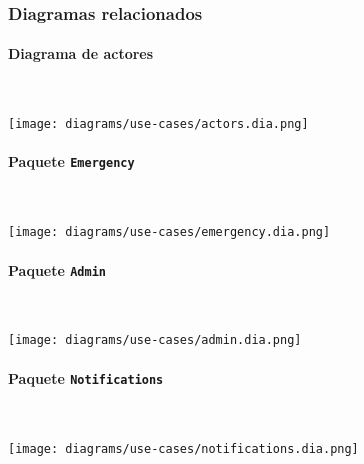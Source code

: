 \subsubsection{Diagramas relacionados}
\paragraph{Diagrama de actores} \hfill \\
\begin{minipage}{\linewidth}
    \texttt{[image: diagrams/use-cases/actors.dia.png]}
\end{minipage}

\clearpage
\paragraph{Paquete \texttt{Emergency}} \hfill \\
\begin{minipage}{\linewidth}
    \texttt{[image: diagrams/use-cases/emergency.dia.png]}
\end{minipage}

\paragraph{Paquete \texttt{Admin}} \hfill \\
\begin{minipage}{\linewidth}
    \texttt{[image: diagrams/use-cases/admin.dia.png]}
\end{minipage}

\paragraph{Paquete \texttt{Notifications}} \hfill \\
\begin{minipage}{\linewidth}
    \texttt{[image: diagrams/use-cases/notifications.dia.png]}
\end{minipage}

